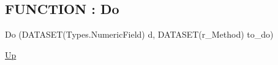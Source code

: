 \par
\par
\subsection*{FUNCTION : Do}
\hypertarget{ecldoc:ml_core.discretize.do}{}
\begin{minipage}[t]{\textwidth}
\begin{flushleft}
 Do (DATASET(Types.NumericField) d, DATASET(r\_Method) to\_do)
\end{flushleft}
\end{minipage}
\hyperlink{ecldoc:ML_Core.Discretize}{Up}

\par
\par

